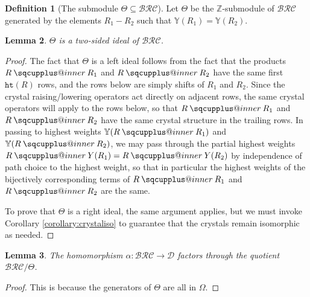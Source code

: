 \documentclass[a4paper,fleqn]{cas-sc}
\makeatletter
\newcommand{\sqcupplus@inner}[2]{%
  \vcenter{\hbox{\ooalign{%
    \hfil$\m@th#1\sqcup$\hfil\cr
    \hfil\raisebox{0.15ex}{$\m@th#1\scriptscriptstyle+$}\hfil\cr
  }}}%
}
\newcommand{\sqcupplus}{\mathbin{\mathpalette\sqcupplus@inner\relax}}
\newtheorem{lemma}{Lemma}[subsection]
\newtheorem{proposition}[lemma]{Proposition}
\theoremstyle{definition}
\newtheorem{definition}[lemma]{Definition}
\theoremstyle{remark}
\numberwithin{equation}{subsection}
\newcommand{\wtt}{\mathtt{wt}}
\newcommand{\hr}{\mathtt{ht}}
\newcommand{\BRC}{\mathcal{BRC}}
\newcommand{\RC}{\mathcal{RC}}
\newcommand{\dcoma}{\mathcal{D}}
\makeatother
\begin{document}

\begin{definition}[The submodule $\Theta\subseteq \BRC$]\label{definition:theta}
  Let $\Theta$ be the $\mathbb{Z}$-submodule of $\BRC$ generated by the elements $R_1-R_2$ such that $\mathbb{Y}(R_1)=\mathbb{Y}(R_2)$.

\end{definition}

\begin{lemma}
  $\Theta$ is a two-sided ideal of $\BRC$.
\end{lemma}
\begin{proof}
  The fact that $\Theta$ is a left ideal follows from the fact that the products $R\sqcupplus R_1$ and $R\sqcupplus R_2$ have the same first $\hr(R)$ rows, and the rows below are simply shifts of $R_1$ and $R_2$. Since the crystal raising/lowering operators act directly on adjacent rows, the same crystal operators will apply to the rows below, so that $R\sqcupplus R_1$ and $R\sqcupplus R_2$ have the same crystal structure in the trailing rows. In passing to highest weights $\mathbb{Y}(R\sqcupplus R_1)$ and $\mathbb{Y}(R\sqcupplus R_2)$, we may pass through the partial highest weights $R\sqcupplus Y(R_1) = R\sqcupplus Y(R_2)$ by independence of path choice to the highest weight, so that in particular the highest weights of the bijectively corresponding terms of $R\sqcupplus R_1$ and $R\sqcupplus R_2$ are the same.
  

  To prove that $\Theta$ is a right ideal, the same argument applies, but we must invoke Corollary \ref{corollary:crystaliso} to guarantee that the crystals remain isomorphic as needed.
\end{proof}

\begin{lemma}
  The homomorphism $\alpha:\BRC\to\dcoma$ factors through the quotient $\BRC/\Theta$.
\end{lemma}
\begin{proof}
This is because the generators of $\Theta$ are all in $\Omega$.
\end{proof}
\end{document}
